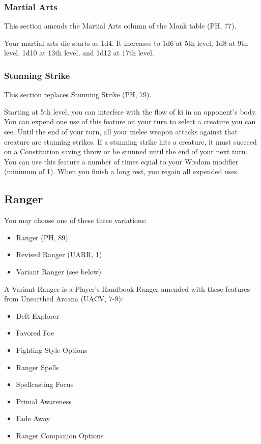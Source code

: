 \documentclass[letterpaper,twocolumn,openany,nodeprecatedcode]{dndbook}
\begin{document}
\subsubsection{Martial Arts}
This section amends the Martial Arts column of the Monk table (PH, 77).

Your martial arts die starts as 1d4. It increases to 1d6 at 5th level, 1d8 at 9th level, 1d10 at 13th level, and 1d12 at 17th level.

\subsubsection{Stunning Strike}
This section replaces Stunning Strike (PH, 79).

Starting at 5th level, you can interfere with the flow of ki in an opponent's body. You can expend one use of this feature on your turn to select a creature you can see. Until the end of your turn, all your melee weapon attacks against that creature are stunning strikes. If a stunning strike hits a creature, it must succeed on a Constitution saving throw or be stunned until the end of your next turn. You can use this feature a number of times equal to your Wisdom modifier (minimum of 1). When you finish a long rest, you regain all expended uses.

\subsection{Ranger}
\label{classRanger}

You may choose one of these three variations:

\begin{itemize}
    \item Ranger (PH, 89)
    \item Revised Ranger (UARR, 1)
    \item Variant Ranger (see below)
\end{itemize}

A Variant Ranger is a Player's Handbook Ranger amended with these features from Unearthed Arcana (UACV, 7-9):

\begin{itemize}
    \item Deft Explorer
    \item Favored Foe
    \item Fighting Style Options
    \item Ranger Spells
    \item Spellcasting Focus
    \item Primal Awareness
    \item Fade Away
    \item Ranger Companion Options
\end{itemize}
\end{document}
